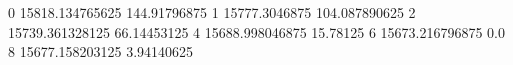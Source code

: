 0 15818.134765625 144.91796875
1 15777.3046875 104.087890625
2 15739.361328125 66.14453125
4 15688.998046875 15.78125
6 15673.216796875 0.0
8 15677.158203125 3.94140625
